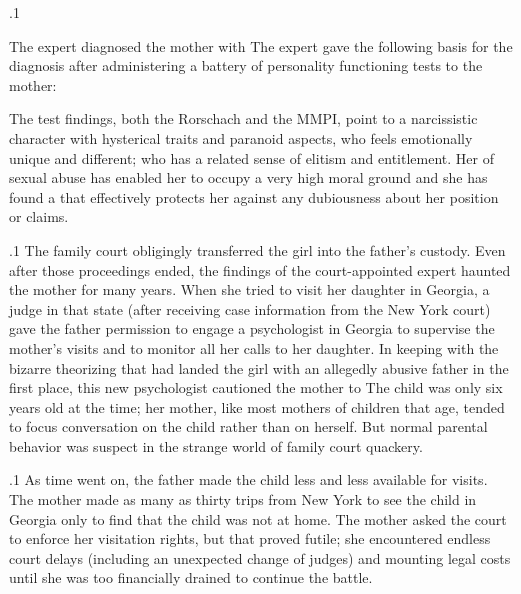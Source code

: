 \documentclass[11pt, twoside]{article}
\begin{document}
{{}%

\p.1{%
The expert diagnosed the mother with  The expert
gave the following basis for the diagnosis after administering a battery
of personality functioning tests to the mother:

\begin{blockQuote}
The test findings, both the Rorschach and the MMPI, point to a
narcissistic character with hysterical traits and paranoid aspects,
who feels emotionally unique and different; who has a related
sense of elitism and entitlement. Her  of sexual abuse
has enabled her to occupy a very high moral ground and she has
found a  that effectively protects her against any
dubiousness about her position or claims.
\end{blockQuote}

}%

\p.1{%
The family court obligingly transferred the girl into the father’s
custody. Even after those proceedings ended, the findings of
the court-appointed expert haunted the mother for many years. When she tried to
visit her daughter in Georgia, a judge in that state (after receiving case
information from the New York court) gave the father permission to
engage a psychologist in Georgia to supervise the mother’s visits and to
monitor all her calls to her daughter. In keeping with the bizarre theorizing that had landed the girl with an allegedly abusive father in the first
place, this new psychologist cautioned the mother to  The
child was only six years old at the time; her mother, like most mothers of children that age, tended to focus conversation on the child rather
than on herself. But normal parental behavior was suspect in the strange
world of family court quackery.
}%

\p.1{%
As time went on, the father made the child less and less available for
visits. The mother made as many as thirty trips from New York to see
the child in Georgia only to find that the child was not at home. The
mother asked the court to enforce her visitation rights, but that proved
futile; she encountered endless court delays (including an unexpected
change of judges) and mounting legal costs until she was too financially
drained to continue the battle.
}%

}
\end{document}
